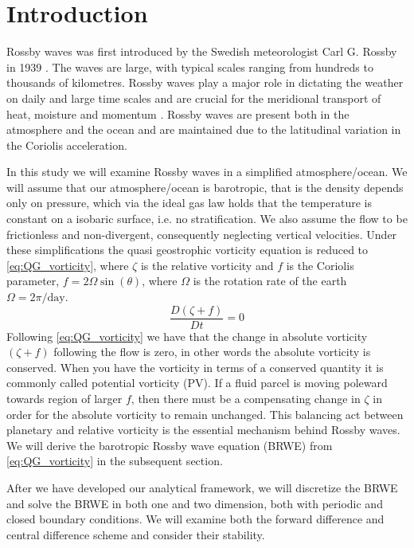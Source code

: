 \section{Introduction}
Rossby waves was first introduced by the Swedish meteorologist
Carl G. Rossby in 1939 \parencite{Rossby1939}. The waves are large, with typical scales ranging from
hundreds to thousands of kilometres. Rossby waves play a major role in dictating
the weather on daily and large time scales and are crucial for the meridional
transport of heat, moisture and momentum \parencite{midSynDyn}.
Rossby waves are present both in the atmosphere and the ocean and are maintained
due to the latitudinal variation in the Coriolis acceleration.

In this study we will examine Rossby waves in a simplified
atmosphere/ocean. We will assume that our atmosphere/ocean is barotropic, that
is the density depends only on pressure, which via the ideal gas law holds that
the temperature is constant on a isobaric surface, i.e. no stratification. We also assume the flow to be frictionless and
non-divergent, consequently neglecting vertical velocities. Under these
simplifications the quasi geostrophic vorticity equation is reduced to
\cref{eq:QG_vorticity}, where $\zeta$ is the relative vorticity and $f$ is the
Coriolis parameter, $f=2\Omega \sin(\theta)$, where $\Omega$ is
the rotation rate of the earth $\Omega = 2\pi/ \mathrm{day}$.
\begin{equation}\label{eq:QG_vorticity}
    \frac{D(\zeta + f)}{Dt} = 0
\end{equation}
Following \cref{eq:QG_vorticity} we have that the
change in absolute vorticity $(\zeta + f)$ following the flow is zero, in other
words the absolute vorticity is conserved. When you have the vorticity in terms
of a conserved quantity it is commonly called potential vorticity (PV). If a fluid parcel is moving
poleward towards region of larger $f$, then there must be a compensating change
in $\zeta$ in order for the absolute vorticity to remain unchanged. This
balancing act between planetary and relative vorticity is the essential
mechanism behind
Rossby waves. We will derive the barotropic Rossby
wave equation (BRWE) from \cref{eq:QG_vorticity} in the subsequent section.

After we have developed our analytical framework, we will discretize the BRWE
and solve the BRWE in both one and two dimension, both with periodic and
closed boundary conditions. We will examine both the forward
difference and central difference scheme and consider their stability.
